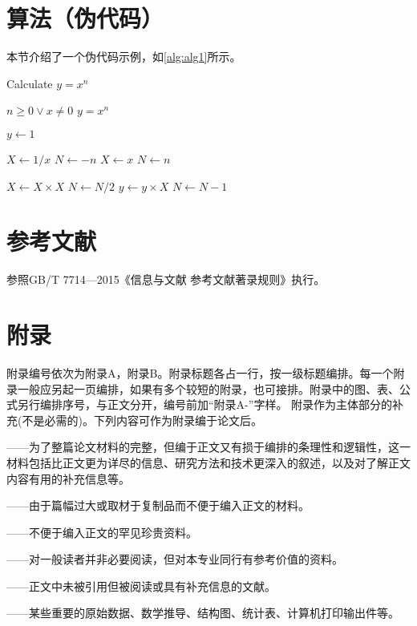 \section{算法（伪代码）}
本节介绍了一个伪代码示例，如\cref{alg:alg1}所示。
\begin{algorithm}
	\caption{Calculate $y = x^n$} 
	\label{alg:alg1}
	\begin{algorithmic}[1]
		\REQUIRE $n \geq 0 \vee x \neq 0$ 
		\ENSURE $y = x^n$ 
		
		\STATE $y \leftarrow 1$ 
		
			\STATE $X \leftarrow 1 / x$ 
			\STATE $N \leftarrow -n$ 
		\ELSE 
			\STATE $X \leftarrow x$ 
			\STATE $N \leftarrow n$
		\ENDIF
		
				\STATE $X \leftarrow X \times X$ 
				\STATE $N \leftarrow N / 2$ 
				\STATE $y \leftarrow y \times X$ 
				\STATE $N \leftarrow N - 1$ 
			\ENDIF 
		\ENDWHILE
	\end{algorithmic}
\end{algorithm}

\section{参考文献}
参照GB/T 7714—2015《信息与文献 参考文献著录规则》执行。
\section{附录}
附录编号依次为附录A，附录B。附录标题各占一行，按一级标题编排。每一个附录一般应另起一页编排，如果有多个较短的附录，也可接排。附录中的图、表、公式另行编排序号，与正文分开，编号前加“附录A-”字样。
附录作为主体部分的补充(不是必需的)。下列内容可作为附录编于论文后。

——为了整篇论文材料的完整，但编于正文又有损于编排的条理性和逻辑性，这一材料包括比正文更为详尽的信息、研究方法和技术更深入的叙述，以及对了解正文内容有用的补充信息等。

——由于篇幅过大或取材于复制品而不便于编入正文的材料。

——不便于编入正文的罕见珍贵资料。

——对一般读者并非必要阅读，但对本专业同行有参考价值的资料。

——正文中未被引用但被阅读或具有补充信息的文献。

——某些重要的原始数据、数学推导、结构图、统计表、计算机打印输出件等。
